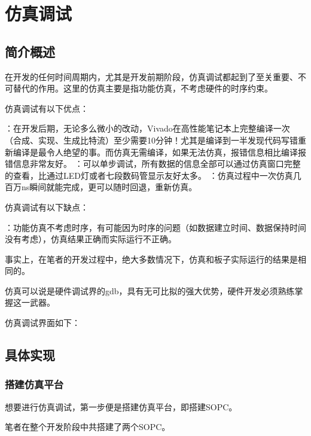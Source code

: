 \chapter{仿真调试}

\section{简介概述}

在开发的任何时间周期内，尤其是开发前期阶段，仿真调试都起到了至关重要、不可替代的作用。这里的仿真主要是指功能仿真，不考虑硬件的时序约束。

仿真调试有以下优点：

\begin{enumerate}
：在开发后期，无论多么微小的改动，Vivado在高性能笔记本上完整编译一次（合成、实现、生成比特流）至少需要10分钟！尤其是编译到一半发现代码写错重新编译是最令人绝望的事。而仿真无需编译，如果无法仿真，报错信息相比编译报错信息非常友好。
：可以单步调试，所有数据的信息全部可以通过仿真窗口完整的查看，比通过LED灯或者七段数码管显示友好太多。
：仿真过程中一次仿真几百万ns瞬间就能完成，更可以随时回退，重新仿真。
\end{enumerate}

仿真调试有以下缺点：

\begin{enumerate}
：功能仿真不考虑时序，有可能因为时序的问题（如数据建立时间、数据保持时间没有考虑），仿真结果正确而实际运行不正确。
\end{enumerate}

事实上，在笔者的开发过程中，绝大多数情况下，仿真和板子实际运行的结果是相同的。

仿真可以说是硬件调试界的gdb，具有无可比拟的强大优势，硬件开发必须熟练掌握这一武器。

仿真调试界面如下：


\section{具体实现}

\subsection{搭建仿真平台}

想要进行仿真调试，第一步便是搭建仿真平台，即搭建SOPC。

笔者在整个开发阶段中共搭建了两个SOPC。

